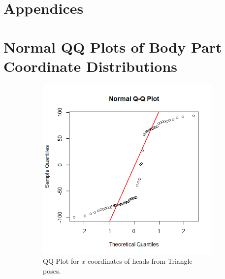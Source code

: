 \documentclass{article}
\begin{document}
\newpage
\appendix
\section*{Appendices}
\section{Normal QQ Plots of Body Part Coordinate Distributions}
\label{app: QQ}
\begin{figure}[h!]
    \caption{A set of QQ plots demonstrating that the Triangle pose adheres less to the Gaussian distribution assumption than the Bridge pose for some selections of body parts.}
    \label{fig: QQs}
    \centering
    \begin{subfigure}[b]{0.4\linewidth}
        \includegraphics[width=\linewidth]{limb-distribution/triangle_qq_head_x.png}
        \caption{QQ Plot for $x$ coordinates of heads from Triangle poses.}
        \label{fig: tri head}
    \end{subfigure}
    \hspace{1cm}
    \begin{subfigure}[b]{0.4\linewidth}

\end{subfigure}
\end{figure}
\end{document}

